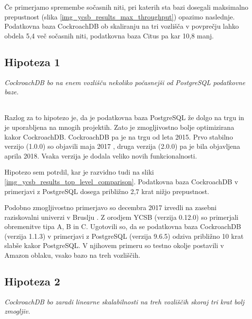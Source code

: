 \documentclass[a4paper, 12pt]{book}
\begin{document}
Če primerjamo spremembe sočasnih niti, pri katerih sta bazi dosegali maksimalno prepustnost (slika \ref{img_ycsb_results_max_throughput}) opazimo naslednje. Podatkovna baza CockroachDB ob skaliranju na tri vozlišča v povprečju lahko obdela 5,4 več sočasnih niti, podatkovna baza Citus pa kar 10,8 manj.

\subsection{Hipoteza 1}
\textit{CockroachDB bo na enem vozlišču nekoliko počasnejši od PostgreSQL podatkovne baze.}

\ \\
Razlog za to hipotezo je, da je podatkovna baza PostgreSQL že dolgo na trgu \cite{Postgres-first-release} in je uporabljena na mnogih projektih. Zato je zmogljivostno bolje optimizirana kakor CockroachDB. CockroachDB pa je na trgu od leta 2015. Prvo stabilno verzijo (1.0.0) so objavili maja 2017 \cite{CRDB-2017}, druga verzija (2.0.0) pa je bila objavljena aprila 2018. Vsaka verzija je dodala veliko novih funkcionalnosti.


Hipotezo sem potrdil, kar je razvidno tudi na sliki \ref{img_ycsb_results_top_level_comparison}. Podatkovna baza CockroachDB v primerjavi z PostgreSQL dosega približno 2,7 krat nižjo prepustnost.

Podobno zmogljivostno primerjavo so decembra 2017 izvedli na zasebni raziskovalni univerzi v Bruslju \cite{CRDB-2017}. Z orodjem YCSB (verzija 0.12.0) so primerjali obremenitve tipa A, B in C. Ugotovili so, da se podatkovna baza CockroachDB (verzija 1.1.3) v primerjavi z PostgreSQL (verzija 9.6.5) odziva približno 10 krat slabše kakor PostgreSQL. V njihovem primeru so testno okolje postavili v Amazon oblaku, vsako bazo na treh vozliščih.

\subsection{Hipoteza 2}
\textit{CockroachDB bo zaradi linearne skalabilnosti na treh vozliščih skoraj tri krat bolj zmogljiv.}
\end{document}
